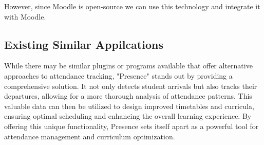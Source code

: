 However, since Moodle is open-source we can use this technology and integrate it with Moodle.


\subsection{Existing Similar Appilcations}
While there may be similar plugins or programs available that offer alternative approaches to attendance tracking, "Presence" stands out by providing a comprehensive solution. It not only detects student arrivals but also tracks their departures, allowing for a more thorough analysis of attendance patterns. This valuable data can then be utilized to design improved timetables and curricula, ensuring optimal scheduling and enhancing the overall learning experience. By offering this unique functionality, Presence sets itself apart as a powerful tool for attendance management and curriculum optimization.

